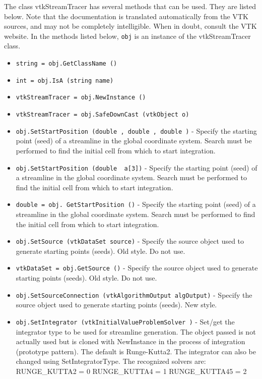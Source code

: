 The class vtkStreamTracer has several methods that can be used.
  They are listed below.
Note that the documentation is translated automatically from the VTK sources,
and may not be completely intelligible.  When in doubt, consult the VTK website.
In the methods listed below, \verb|obj| is an instance of the vtkStreamTracer class.
\begin{itemize}
\item  \verb|string = obj.GetClassName ()|

\item  \verb|int = obj.IsA (string name)|

\item  \verb|vtkStreamTracer = obj.NewInstance ()|

\item  \verb|vtkStreamTracer = obj.SafeDownCast (vtkObject o)|

\item  \verb|obj.SetStartPosition (double , double , double )| -  Specify the starting point (seed) of a streamline in the global
 coordinate system. Search must be performed to find the initial cell
 from which to start integration.

\item  \verb|obj.SetStartPosition (double  a[3])| -  Specify the starting point (seed) of a streamline in the global
 coordinate system. Search must be performed to find the initial cell
 from which to start integration.

\item  \verb|double = obj. GetStartPosition ()| -  Specify the starting point (seed) of a streamline in the global
 coordinate system. Search must be performed to find the initial cell
 from which to start integration.

\item  \verb|obj.SetSource (vtkDataSet source)| -  Specify the source object used to generate starting points (seeds).
 Old style. Do not use.

\item  \verb|vtkDataSet = obj.GetSource ()| -  Specify the source object used to generate starting points (seeds).
 Old style. Do not use.

\item  \verb|obj.SetSourceConnection (vtkAlgorithmOutput algOutput)| -  Specify the source object used to generate starting points (seeds).
 New style.

\item  \verb|obj.SetIntegrator (vtkInitialValueProblemSolver )| -  Set/get the integrator type to be used for streamline generation. 
 The object passed is not actually used but is cloned with 
 NewInstance in the process of integration  (prototype pattern). 
 The default is Runge-Kutta2. The integrator can also be changed
 using SetIntegratorType. The recognized solvers are:
 RUNGE\_KUTTA2  = 0
 RUNGE\_KUTTA4  = 1
 RUNGE\_KUTTA45 = 2


\end{itemize}

